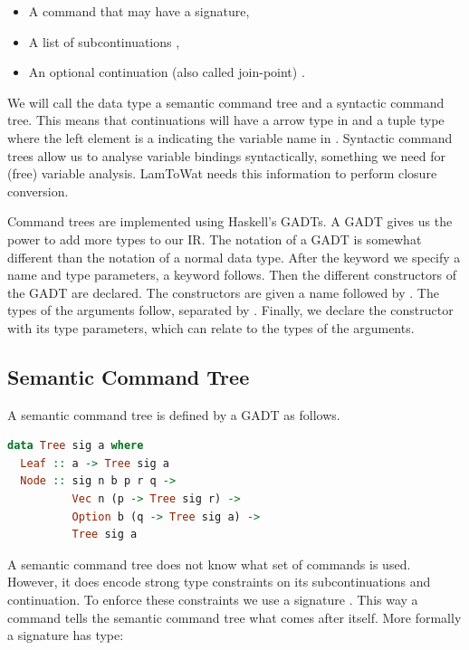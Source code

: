 \begin{itemize}
\item A command  that may have a signature,
\item A list of subcontinuations ,
\item An optional continuation (also called join-point) .
\end{itemize}

We will call the data type  a semantic command tree and  a syntactic command tree. This means that continuations will have a arrow type  in  and a tuple type where the left element is a  indicating the variable name  in . Syntactic command trees allow us to analyse variable bindings syntactically, something we need for (free) variable analysis. LamToWat needs this information to perform closure conversion.

Command trees are implemented using Haskell's GADTs. A GADT gives us the power to add more types to our IR. The notation of a GADT is somewhat different than the notation of a normal data type. After the  keyword we specify a name and type parameters, a  keyword follows. Then the different constructors of the GADT are declared. The constructors are given a name followed by \icode{::}. The types of the arguments follow, separated by \icode{->}. Finally, we declare the constructor with its type parameters, which can relate to the types of the arguments.

\subsection{\label{subsection:semantree}Semantic Command Tree}
A semantic command tree  is defined by a GADT as follows.

\begin{lstlisting}[language=Haskell]
data Tree sig a where
  Leaf :: a -> Tree sig a
  Node :: sig n b p r q ->
          Vec n (p -> Tree sig r) ->
          Option b (q -> Tree sig a) ->
          Tree sig a
\end{lstlisting}

A semantic command tree does not know what set of commands is used. However, it does encode strong type constraints on its subcontinuations and continuation. To enforce these constraints we use a signature . This way a command tells the semantic command tree what comes after itself. More formally a signature has type:

